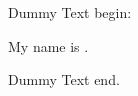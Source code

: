 Dummy Text begin:

My name is \fullName.

\descriptions

\workExperienceList

\acronymlist

Dummy Text end.